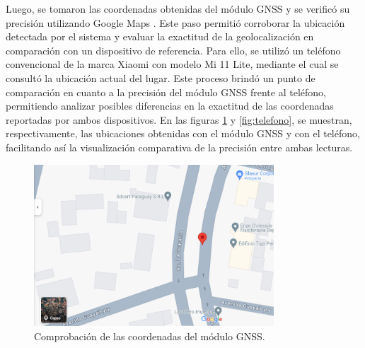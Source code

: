 Luego, se tomaron las coordenadas obtenidas del módulo GNSS y se verificó su precisión utilizando Google Maps \cite{Google_Maps}. Este paso permitió corroborar la ubicación detectada por el sistema y evaluar la exactitud de la geolocalización en comparación con un dispositivo de referencia. Para ello, se utilizó un teléfono convencional de la marca Xiaomi con modelo Mi 11 Lite, mediante el cual se consultó la ubicación actual del lugar. Este proceso brindó un punto de comparación en cuanto a la precisión del módulo GNSS frente al teléfono, permitiendo analizar posibles diferencias en la exactitud de las coordenadas reportadas por ambos dispositivos.
En las figuras \ref{fig:google} y \ref{fig:telefono}, se muestran, respectivamente, las ubicaciones obtenidas con el módulo GNSS y con el teléfono, facilitando así la visualización comparativa de la precisión entre ambas lecturas.


\begin{figure}[H]
\leavevmode
\begin{minipage}{\textwidth}
\begin{center}
\includegraphics[width=0.8\textwidth]{./capitulo_05/imagen/googlemaps.png}
\caption{Comprobación de las coordenadas del módulo GNSS.\label{fig:google}}
\end{center}
\end{minipage}
\end{figure}


